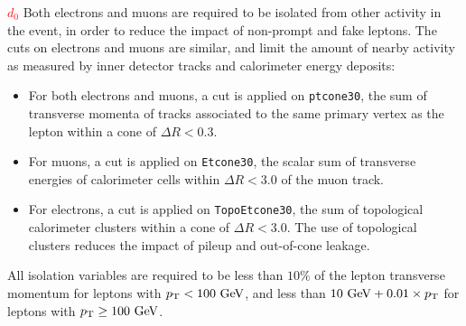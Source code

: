 \textcolor{red}{$d_0$}
Both electrons and muons are required to be isolated from other activity in the event, in order to reduce the impact of non-prompt and fake leptons. The cuts on electrons and muons are similar, and limit the amount of nearby activity as measured by inner detector tracks and calorimeter energy deposits:
\begin{itemize}
	\item For both electrons and muons, a cut is applied on \verb.ptcone30., the sum of transverse momenta of tracks associated to the same primary vertex as the lepton within a cone of $\Delta R<0.3$. 
	\item For muons, a cut is applied on \verb.Etcone30., the scalar sum of transverse energies of calorimeter cells within $\Delta R<3.0$ of the muon track. 
	\item For electrons, a cut is applied on \verb.TopoEtcone30., the sum of topological calorimeter clusters within a cone of $\Delta R < 3.0$. The use of topological clusters reduces the impact of pileup and out-of-cone leakage. 
\end{itemize}

All isolation variables are required to be less than $10\%$ of the lepton transverse momentum for leptons with $p_{\text{T}}<100~\mbox{GeV}$, and less than $10~\mbox{GeV}+0.01\times p_{\text{T}}$ for leptons with $p_{\text{T}}\geq 100~\mbox{GeV}$. 

